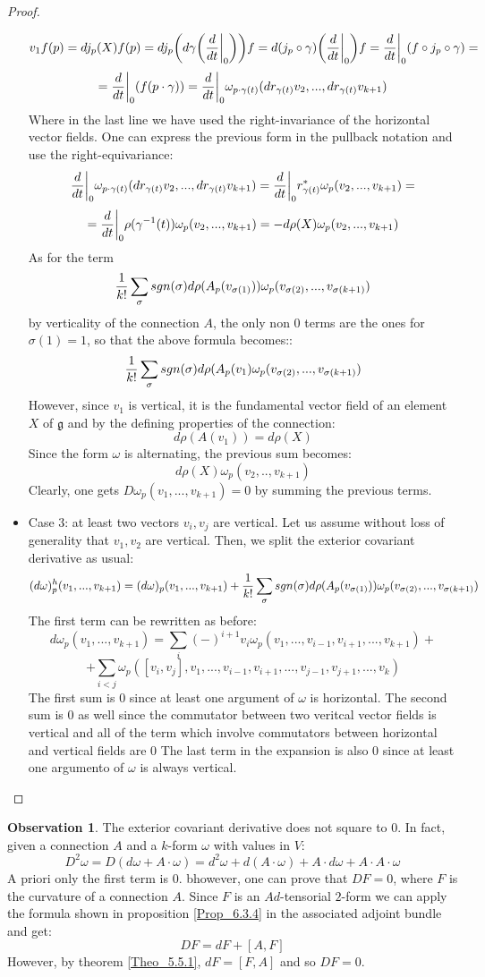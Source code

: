 \documentclass[12pt,a4paper]{report}
\theoremstyle{definition}
\theoremstyle{Theorem}
\theoremstyle{definition}
\theoremstyle{definition}
\newtheorem{Obs}[Def]{Observation}
\begin{document}
\begin{proof}
\begin{itemize}
			$$v_1f(p)=dj_p(X)f(p)=dj_p\bigg( d\gamma\bigg({d\over dt}\bigg|_0\bigg)\bigg)f=d(j_p\circ \gamma)\bigg({d\over dt}\bigg|_0\bigg)f={d\over dt}\bigg|_0 (f\circ j_p\circ \gamma)=$$
			$$={d\over dt}\bigg|_0(f(p\cdot \gamma))={d\over dt}\bigg|_0\omega_{p\cdot \gamma(t)}(dr_{\gamma(t)}v_2,...,dr_{\gamma(t)}v_{k+1})$$
			Where in the last line we have used the right-invariance of the horizontal vector fields. One can express the previous form in the pullback notation and use the right-equivariance:
			$${d\over dt}\bigg|_0\omega_{p\cdot \gamma(t)}(dr_{\gamma(t)}v_2,...,dr_{\gamma(t)}v_{k+1})={d\over dt}\bigg|_0r^*_{\gamma(t)}\omega_{p}(v_2,...,v_{k+1})=$$
			$$={d\over dt}\bigg|_0\rho(\gamma^{-1}(t))\omega_{p}(v_2,...,v_{k+1})=-d\rho(X)\omega_{p}(v_2,...,v_{k+1})$$
			As for the term
			$${1\over k!}\sum_\sigma sgn(\sigma)d\rho(A_p(v_{\sigma(1)}))\omega_p(v_{\sigma(2)},...,v_{\sigma(k+1)})$$
			by verticality of the connection $A$, the only non 0 terms are the ones for $\sigma(1)=1$, so that the above formula becomes::
			$${1\over k!}\sum_\sigma sgn(\sigma)d\rho(A_p(v_1)\omega_p(v_{\sigma(2)},...,v_{\sigma(k+1)})$$
			However, since $v_1$ is vertical, it is the fundamental vector field of an element $X$ of $\mathfrak{g}$ and by the defining properties of the connection:
			$$d\rho(A(v_1))=d\rho(X)$$
			Since the form $\omega$ is alternating, the previous sum becomes:
			$$d\rho(X)\omega_p(v_2,..,v_{k+1})$$
			Clearly, one gets $D\omega_p(v_1,...,v_{k+1})=0$ by summing the previous terms.
			\item Case 3: at least two vectors $v_i,v_j$ are vertical. Let us assume without loss of generality that $v_1,v_2$ are vertical. Then, we split the exterior covariant derivative as usual:
			$$(d\omega)^h_p(v_1,...,v_{k+1})=(d\omega)_p(v_1,...,v_{k+1})+{1\over k!}\sum_\sigma sgn(\sigma)d\rho(A_p(v_{\sigma(1)}))\omega_p(v_{\sigma(2)},...,v_{\sigma(k+1)})$$
			The first term can be rewritten as before:
			$$d\omega_p(v_1,...,v_{k+1})=\sum_i (-)^{i+1}v_i\omega_p(v_1,...,v_{i-1},v_{i+1},...,v_{k+1})+$$
			$$+\sum_{i<j}\omega_p([v_i,v_j],v_1,...,v_{i-1},v_{i+1},...,v_{j-1},v_{j+1},...,v_k)$$
			The first sum is 0 since at least one argument of $\omega$ is horizontal. The second sum is 0 as well since the commutator between two veritcal vector fields is vertical and all of the term which involve commutators between horizontal and vertical fields are 0
			The last term in the expansion is also 0 since at least one argumento of $\omega$ is always vertical.
		\end{itemize}
	\end{proof}
	\begin{Obs}\label{Obs_6.3.5}
		The exterior covariant derivative does not square to 0. In fact, given a connection $A$ and a $k$-form $\omega$ with values in $V$:
		$$D^2\omega=D(d\omega+A\cdot \omega)=d^2\omega+d(A\cdot \omega)+A\cdot d\omega+A\cdot A\cdot \omega$$
		A priori only the first term is 0. bhowever, one can prove that $DF=0$, where $F$ is the curvature of a connection $A$. Since $F$ is an $Ad$-tensorial $2$-form we can apply the formula shown in proposition \ref{Prop_6.3.4} in the associated adjoint bundle and get:
		$$DF=dF+[A,F]$$
		However, by theorem \ref{Theo_5.5.1}, $dF=[F,A]$ and so $DF=0$.
	\end{Obs}
\end{document}
